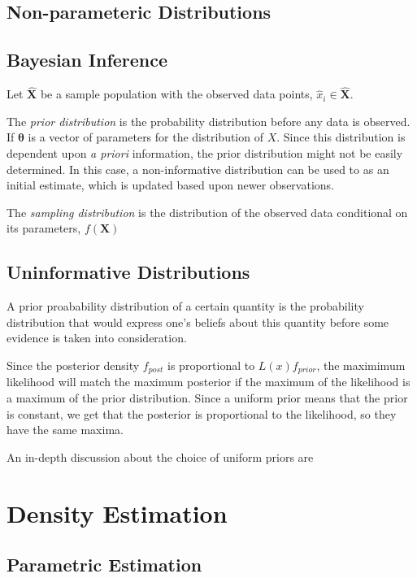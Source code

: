 \subsection{Non-parameteric Distributions}


\subsection{Bayesian Inference}
\label{section:bayes}

Let $\hat{\bm{X}}$ be a sample population with the observed data points, $\hat{x}_i \in \hat{\bm{X}}$.

The \emph{prior distribution} is the probability distribution before any data is observed.  If $\bm{\theta}$ is a vector of parameters for the distribution of $X$.   Since this distribution is dependent upon \emph{a priori} information, the prior distribution might not be easily determined.  In this case, a non-informative distribution can be used to as an initial estimate, which is updated based upon newer observations.

The \emph{sampling distribution} is the distribution of the observed data conditional on its parameters, $f(\bm{X})$

\subsection{Uninformative Distributions}
\label{section:bayes_prior}
A prior proabability distribution of a certain  quantity is the probability distribution that would express one's beliefs about this quantity before some evidence is taken into consideration.

Since the posterior density $f_{post}$ is proportional to $L(x)f_{prior}$, the maximimum likelihood will match the maximum posterior if the maximum of the likelihood is a maximum of the prior distribution.  Since a uniform prior means that the prior is constant, we get that the posterior is proportional to the likelihood, so they have the same maxima.

An in-depth discussion about the choice of uniform priors are

\section{Density Estimation}

\subsection{Parametric Estimation}

